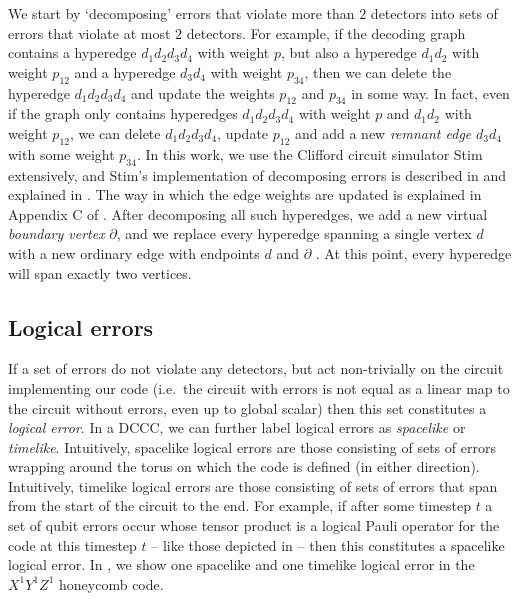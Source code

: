 We start by `decomposing' errors that violate more than $2$ detectors into sets of errors that violate at most $2$ detectors.
For example, if the decoding graph contains a hyperedge $d_1 d_2 d_3 d_4$ with weight $p$,
but also a hyperedge $d_1 d_2$ with weight $p_{12}$ and a hyperedge $d_3 d_4$ with weight $p_{34}$,
then we can delete the hyperedge $d_1 d_2 d_3 d_4$ and update the weights $p_{12}$ and $p_{34}$ in some way.
In fact, even if the graph only contains hyperedges $d_1 d_2 d_3 d_4$ with weight $p$ and $d_1 d_2$ with weight $p_{12}$,
we can delete $d_1 d_2 d_3 d_4$, update $p_{12}$ and add a new \emph{remnant edge} $d_3 d_4$ with some weight $p_{34}$.
In this work, we use the Clifford circuit simulator Stim~\cite{Gidney2021stimfaststabilizer} extensively,
and Stim's implementation of decomposing errors is described in  and explained in .
The way in which the edge weights are updated is explained in Appendix C of .
After decomposing all such hyperedges, we add a new virtual \emph{boundary vertex} $\partial$, and we replace every hyperedge spanning a single vertex $d$ with a new ordinary edge with endpoints $d$ and $\partial$ \cite{higgott2025sparse}.
At this point, every hyperedge will span exactly two vertices.

\subsection{Logical errors}\label{subsec:DCCCs_logical_errors}

If a set of errors do not violate any detectors,
but act non-trivially on the circuit implementing our code
(i.e.\ the circuit with errors is not equal as a linear map to the circuit without errors, even up to global scalar)
then this set constitutes a \textit{logical error}.
In a DCCC, we can further label logical errors as \textit{spacelike} or \textit{timelike}.
Intuitively, spacelike logical errors are those consisting of sets of errors wrapping around the torus on which the code is defined (in either direction).
Intuitively, timelike logical errors are those consisting of sets of errors that span from the start of the circuit to the end.
For example, if after some timestep $t$ a set of qubit errors occur whose tensor product is a logical Pauli operator for the code at this timestep $t$ -- like those depicted in  -- then this constitutes a spacelike logical error.
In , we show one spacelike and one timelike logical error in the $X^1Y^1Z^1$ honeycomb code.

